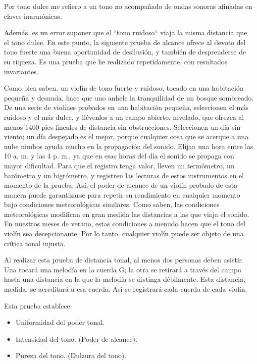 \documentclass[12pt]{book}
\begin{document}
Por tono dulce me refiero a un tono no acompañado de ondas sonoras afinadas en claves inarmónicas.

Además, es un error suponer que el ``tono ruidoso`` viaja la misma distancia que el tono dulce. En este punto, la siguiente prueba de alcance ofrece al devoto del tono fuerte una buena oportunidad de desilusión, y también de desprenderse de su riqueza. Es una prueba que he realizado repetidamente, con resultados invariantes.

Como bien saben, un violín de tono fuerte y ruidoso, tocado en una habitación pequeña y desnuda, hace que uno anhele la tranquilidad de un bosque sombreado. De una serie de violines probados en una habitación pequeña, seleccionen el más ruidoso y el más dulce, y llévenlos a un campo abierto, nivelado, que ofrezca al menos 1400 pies lineales de distancia sin obstrucciones. Seleccionen un día sin viento; un día despejado es el mejor, porque cualquier cosa que se acerque a una nube nimbos ayuda mucho en la propagación del sonido. Elijan una hora entre las 10 a. m. y las 4 p. m., ya que en esas horas del día el sonido se propaga con mayor dificultad. Para que el registro tenga valor, lleven un termómetro, un barómetro y un higrómetro, y registren las lecturas de estos instrumentos en el momento de la prueba. Así, el poder de alcance de un violín probado de esta manera puede garantizarse para repetir su rendimiento en cualquier momento bajo condiciones meteorológicas similares. Como saben, las condiciones meteorológicas modifican en gran medida las distancias a las que viaja el sonido. En nuestros meses de verano, estas condiciones a menudo hacen que el tono del violín sea decepcionante. Por lo tanto, cualquier violín puede ser objeto de una crítica tonal injusta.

Al realizar esta prueba de distancia tonal, al menos dos personas deben asistir.
Una tocará una melodía en la cuerda G; la otra se retirará a través del campo hasta una distancia en la que la melodía se distinga débilmente. Esta distancia, medida, se acreditará a esa cuerda. Así se registrará cada cuerda de cada violín.

Esta prueba establece:
\begin{itemize}
 \item Uniformidad del poder tonal.
 \item Intensidad del tono. (Poder de alcance).
 \item Pureza del tono. (Dulzura del tono).
\end{itemize}
\end{document}
